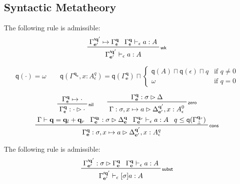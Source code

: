 \documentclass[acmsmall,screen,review]{acmart}
\newcommand{\mb}[1]{\ensuremath{\mathbf{#1}}}
\newcommand{\ms}[1]{\ensuremath{\mathsf{#1}}}
\newcommand{\qsp}[4]{#1 \vdash #2 = #3 + #4}
\newcommand{\cwk}[2]{#1 \mapsto #2}
\newcommand{\rle}[1]{{\scriptsize\textsf{#1}}}
\newcommand{\hasty}[4]{#1 \vdash_{#2} #3: {#4}}
\newcommand{\issubst}[3]{#1: #2 \rhd #3}
\newcommand{\topq}{\omega}
\newcommand{\alquant}{\ms{q}}
\begin{document}
\subsection{Syntactic Metatheory}

\begin{lemma}[name=Weakening, restate=synmonwk]
  The following rule is admissible:
  \begin{equation*}
    \prftree[r]{\rle{wk}}
      {\cwk{\Gamma'^{\mb{q}'}_{\mb{e}'}}{\Gamma^{\mb{q}}_{\ms{e}}}}
      {\hasty{\Gamma^{\mb{q}}_{\ms{e}}}{\epsilon}{a}{A}}
      {\hasty{\Gamma'^{\mb{q}'}_{\mb{e}'}}{\epsilon}{a}{A}}
  \end{equation*}
\end{lemma}

\begin{equation*}
  \alquant(\cdot) = \topq \qquad
  \alquant(\Gamma^{\mb{q}_{\mb{e}}}, x : A^q_\epsilon) 
    = \alquant(\Gamma^{\mb{q}}_{\mb{e}}) \sqcap \begin{cases}
    \alquant(A) \sqcap \alquant(\epsilon) \sqcap q & \text{if } q \neq 0 \\
    \topq & \text{if } q = 0
  \end{cases}
\end{equation*}

\begin{gather*}
  \prftree[r]{\rle{nil}}{\cwk{\Gamma^{\mb{q}}_{\ms{e}}}{\cdot}}
                             {\issubst{\Gamma^{\mb{q}}_{\ms{e}}}{\cdot}{\cdot}} \qquad 
  \prftree[r]{\rle{zero}}
    {\issubst{\Gamma^{\mb{q}}_{\mb{e}}}{\sigma}{\Delta}}
    {\issubst{\Gamma}{\sigma, x \mapsto a}{\Delta^{\mb{q}'}_{\mb{e}'}, x : A^0_\epsilon}}
  \\
  \prftree[r]{\rle{cons}}
    {\qsp{\Gamma}{\mb{q}}{\mb{q}_l}{\mb{q}_r}}
    {\issubst{\Gamma^{\mb{q_l}}_{\mb{e}}}{\sigma}{\Delta^{\mb{q}}_{\mb{e}}}}
    {\hasty{\Gamma^{\mb{q}_r}_{\mb{e}}}{\epsilon}{a}{A}}
    {q \leq \alquant(\Gamma^{\mb{q}_r}_{\bot})}
    {\issubst{\Gamma^{\mb{q}}_{\mb{e}}}{\sigma, x \mapsto a}
    {\Delta^{\mb{q}'}_{\mb{e}'}, x : A^q_\epsilon}}
\end{gather*}

\begin{lemma}[name=Substitution, restate=synmonsubst]
  The following rule is admissible:
  \begin{equation*}
    \prftree[r]{\rle{subst}}
      {\issubst{\Gamma'^{\mb{q}'}_{\mb{e}'}}{\sigma}{\Gamma^{\mb{q}}_{\mb{e}}}}
      {\hasty{\Gamma^{\mb{q}}_{\mb{e}}}{\epsilon}{a}{A}}
      {\hasty{\Gamma'^{\mb{q}'}_{\mb{e}'}}{\epsilon}{[\sigma]a}{A}}
  \end{equation*}
\end{lemma}
\end{document}
